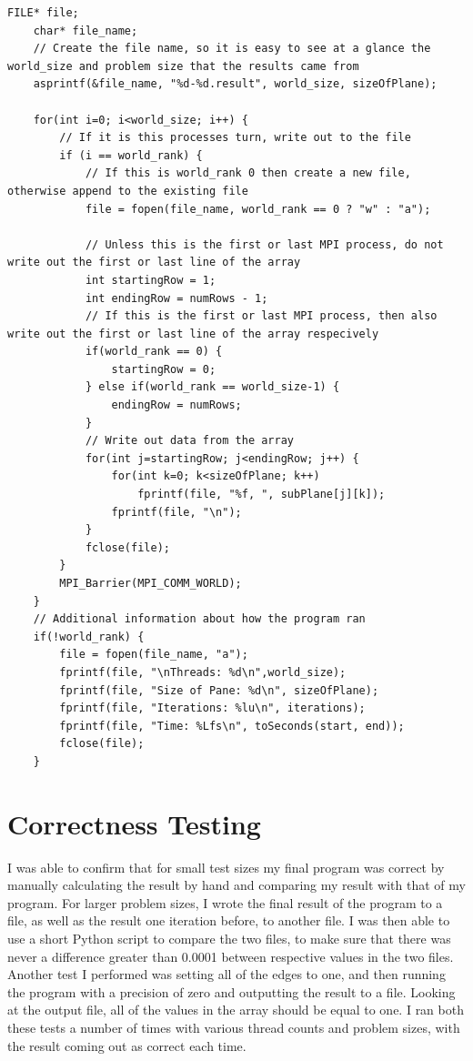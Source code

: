 \documentclass{report}
\begin{document}
\begin{lstlisting}[style=customc,caption=Write Results to File]
    FILE* file;
    char* file_name;
    // Create the file name, so it is easy to see at a glance the world_size and problem size that the results came from
    asprintf(&file_name, "%d-%d.result", world_size, sizeOfPlane);

    for(int i=0; i<world_size; i++) {
        // If it is this processes turn, write out to the file
        if (i == world_rank) {
            // If this is world_rank 0 then create a new file, otherwise append to the existing file
            file = fopen(file_name, world_rank == 0 ? "w" : "a");
            
            // Unless this is the first or last MPI process, do not write out the first or last line of the array
            int startingRow = 1;
            int endingRow = numRows - 1;
            // If this is the first or last MPI process, then also write out the first or last line of the array respecively
            if(world_rank == 0) {
                startingRow = 0;
            } else if(world_rank == world_size-1) {
                endingRow = numRows;
            }
            // Write out data from the array
            for(int j=startingRow; j<endingRow; j++) {
                for(int k=0; k<sizeOfPlane; k++)
                    fprintf(file, "%f, ", subPlane[j][k]);
                fprintf(file, "\n");
            }
            fclose(file);
        }
        MPI_Barrier(MPI_COMM_WORLD);
    }
    // Additional information about how the program ran
    if(!world_rank) {
        file = fopen(file_name, "a");
        fprintf(file, "\nThreads: %d\n",world_size);
        fprintf(file, "Size of Pane: %d\n", sizeOfPlane);
        fprintf(file, "Iterations: %lu\n", iterations);
        fprintf(file, "Time: %Lfs\n", toSeconds(start, end));
        fclose(file);
    }
\end{lstlisting}

\chapter{Correctness Testing}
I was able to confirm that for small test sizes my final program was correct by manually calculating the result by hand and comparing my result with that of my program. For larger problem sizes, I wrote the final result of the program to a file, as well as the result one iteration before, to another file. I was then able to use a short Python script to compare the two files, to make sure that there was never a difference greater than 0.0001 between respective values in the two files.\newline\newline
Another test I performed was setting all of the edges to one, and then running the program with a precision of zero and outputting the result to a file. Looking at the output file, all of the values in the array should be equal to one. I ran both these tests a number of times with various thread counts and problem sizes, with the result coming out as correct each time.
\end{document}
